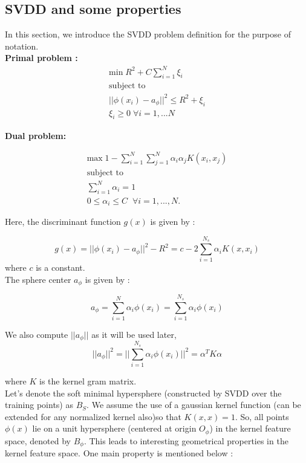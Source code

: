 \documentclass{article} %
\begin{document}
\subsection{SVDD and some properties}
In this section, we introduce the SVDD problem definition for the purpose of notation. \\[10pt]

\textbf{Primal problem :}
\begin{equation}
\begin{split}
\text{min} \; R^2 + C \sum\limits_{i=1}^N \xi_i \\
\text{subject to}\\
||\phi(x_i) - a_{\phi}||^2  \leq R^2 + \xi_i \\
\xi_i \geq 0 \; \forall i = 1,...N
\end{split}
\end{equation}

\textbf{Dual problem:}

\begin{equation}
\begin{split}
\text{max}\; 1 - \sum\limits_{i=1}^N \sum\limits_{j=1}^N \alpha_i \alpha_j K(x_i,x_j) \\
\text{subject to}  \\
\sum\limits_{i = 1}^N \alpha_i  = 1  \\
0 \leq \alpha_i \leq C \;\; \forall  i = 1,...,N.  
\end{split}
\end{equation}


Here, the discriminant function $g(x)$ is given by :

\[ g(x) = ||\phi(x_i) - a_{\phi}||^2 - R^2 = c - 2 \sum\limits_{i=1}^{N_s}\alpha_i K(x,x_i) \]
where $c$ is a constant. \\[10pt]

The sphere center $a_\phi$ is given by :

\[ a_\phi  = \sum\limits_{i=1}^{N} \alpha_i \phi(x_i) = \sum\limits_{i=1}^{N_s} \alpha_i \phi(x_i)\]

We also compute $||a_\phi||$ as it will be used later, 
\begin{equation} \label{norm}
||a_\phi||^2 = ||\sum\limits_{i=1}^{N_s} \alpha_i \phi(x_i) ||^2  = \alpha^T K \alpha
\end{equation}

where $K$ is the kernel gram matrix. \\[10pt]


Let's denote the soft minimal hypersphere (constructed by SVDD over the training points) as $B_S$. We assume the use of a gaussian kernel function (can  be extended for any normalized kernel also)so that $K(x,x) = 1$. So, all points $\phi(x)$ lie on a unit hypersphere (centered at origin $O_\phi$) in the kernel feature space, denoted by $B_\phi$. This leads to interesting geometrical properties in the kernel feature space. One main property is mentioned below : \\[10pt]
\end{document}
